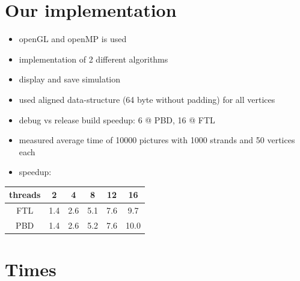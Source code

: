 \documentclass[
paper=192mm:144mm, %
fontsize=12pt, %
pagesize, %
parskip=half-, %
]{scrartcl} %
\theoremstyle{mythmstyle} %
\begin{document}
\clearpage


\section{\color{white}Our implementation}

\begin{itemize}
\setlength\itemsep{-5mm}
\item openGL and openMP is used
\item implementation of 2 different algorithms
\item display and save simulation
\item used aligned data-structure (64 byte without padding) for all vertices
\item debug vs release build speedup: 6 @ PBD, 16 @ FTL
\item measured average time of 10000 pictures with 1000 strands and 50 vertices each
\item speedup:
\end{itemize}

\begin{center}
\begin{tabular}{|c|c|c|c|c|c|}
\hline
threads & 2 & 4 & 8 & 12 & 16 \\
\hline
FTL & 1.4 & 2.6 & 5.1 & 7.6 & 9.7\\
\hline
PBD & 1.4 & 2.6 & 5.2 & 7.6 & 10.0\\
\hline
\end{tabular}
\end{center}

\clearpage


\section{\color{white}Times}
\end{document}
